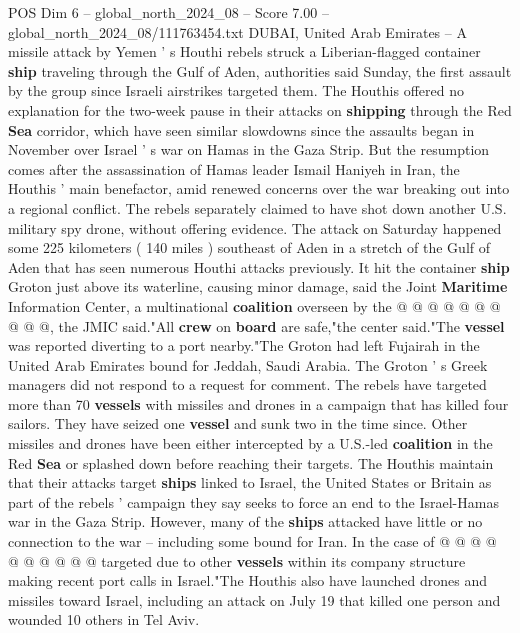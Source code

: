 \begin{textsample}{POS Dim 6 – global\_north\_2024\_08 – Score 7.00 – global\_north\_2024\_08/111763454.txt}  \label{ex:f6_pos_296}
DUBAI, United Arab Emirates -- A missile attack by Yemen ' s Houthi rebels struck a Liberian-flagged container \textbf{ship} traveling through the Gulf of Aden, authorities said Sunday, the first assault by the group since Israeli airstrikes targeted them.
The Houthis offered no explanation for the two-week pause in their attacks on \textbf{shipping} through the Red \textbf{Sea} corridor, which have seen similar slowdowns since the assaults began in November over Israel ' s war on Hamas in the Gaza Strip.
But the resumption comes after the assassination of Hamas leader Ismail Haniyeh in Iran, the Houthis ' main benefactor, amid renewed concerns over the war breaking out into a regional conflict.
The rebels separately claimed to have shot down another U.S. military spy drone, without offering evidence.
The attack on Saturday happened some 225 kilometers ( 140 miles ) southeast of Aden in a stretch of the Gulf of Aden that has seen numerous Houthi attacks previously.
It hit the container \textbf{ship} Groton just above its waterline, causing minor damage, said the Joint \textbf{Maritime} Information Center, a multinational \textbf{coalition} overseen by the @ @ @ @ @ @ @ @ @ @, the JMIC said."All \textbf{crew} on \textbf{board} are safe,"the center said."The \textbf{vessel} was reported diverting to a port nearby."The Groton had left Fujairah in the United Arab Emirates bound for Jeddah, Saudi Arabia.
The Groton ' s Greek managers did not respond to a request for comment.
The rebels have targeted more than 70 \textbf{vessels} with missiles and drones in a campaign that has killed four sailors.
They have seized one \textbf{vessel} and sunk two in the time since.
Other missiles and drones have been either intercepted by a U.S.-led \textbf{coalition} in the Red \textbf{Sea} or splashed down before reaching their targets.
The Houthis maintain that their attacks target \textbf{ships} linked to Israel, the United States or Britain as part of the rebels ' campaign they say seeks to force an end to the Israel-Hamas war in the Gaza Strip.
However, many of the \textbf{ships} attacked have little or no connection to the war -- including some bound for Iran.
In the case of @ @ @ @ @ @ @ @ @ @ targeted due to other \textbf{vessels} within its company structure making recent port calls in Israel."The Houthis also have launched drones and missiles toward Israel, including an attack on July 19 that killed one person and wounded 10 others in Tel Aviv.

\end{textsample}
